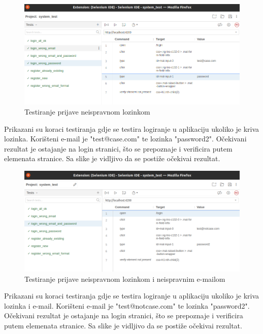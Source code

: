             \begin{figure}[H]
                \includegraphics[width=\textwidth]{slike/tests_system/login_wrong_password.png} %
                \caption{Testiranje prijave neispravnom lozinkom}
                \label{fig:struktura} %
            \end{figure}
            Prikazani su koraci testiranja gdje se testira logiranje u aplikaciju ukoliko je kriva lozinka. Korišteni e-mail je "test@case.com" te lozinka "password2". Očekivani rezultat je ostajanje na login stranici, što se prepoznaje i verificira putem elemenata stranice. Sa slike je vidljivo da se postiže očekivai rezultat.

            \begin{figure}[H]
                \includegraphics[width=\textwidth]{slike/tests_system/login_wrong_email_and_password.png} %
                \caption{Testiranje prijave neispravnom lozinkom i neispravnim e-mailom}
                \label{fig:struktura} %
            \end{figure}
            Prikazani su koraci testiranja gdje se testira logiranje u aplikaciju ukoliko je kriva lozinka i e-mail. Korišteni e-mail je "test@notcase.com" te lozinka "password2". Očekivani rezultat je ostajanje na login stranici, što se prepoznaje i verificira putem elemenata stranice. Sa slike je vidljivo da se postiže očekivai rezultat.

